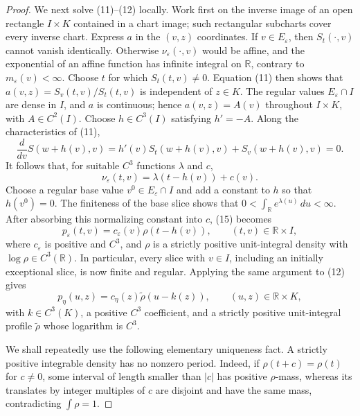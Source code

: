 \documentclass{article}
\begin{document}
\begin{proof}
We next solve (11)--(12) locally.  Work first on the inverse image of an open rectangle \(I\times K\) contained in a chart image; such rectangular subcharts cover every inverse chart.  Express \(a\) in the \((v,z)\) coordinates.  If \(v\in E_\varepsilon\), then \(S_t(\mathord\cdot,v)\) cannot vanish identically.  Otherwise \(\nu_\varepsilon(\mathord\cdot,v)\) would be affine, and the exponential of an affine function has infinite integral on \(\mathbb R\), contrary to \(m_\varepsilon(v)<\infty\).  Choose \(t\) for which \(S_t(t,v)\ne0\).  Equation (11) then shows that \(a(v,z)=S_v(t,v)/S_t(t,v)\) is independent of \(z\in K\).  The regular values \(E_\varepsilon\cap I\) are dense in \(I\), and \(a\) is continuous; hence \(a(v,z)=A(v)\) throughout \(I\times K\), with \(A\in C^2(I)\).  Choose \(h\in C^3(I)\) satisfying \(h'=-A\).  Along the characteristics of (11),
\[
 \frac{d}{dv}S(w+h(v),v)=h'(v)S_t(w+h(v),v)+S_v(w+h(v),v)=0.
\tag{14}
\]
It follows that, for suitable \(C^3\) functions \(\lambda\) and \(c\),
\[
 \nu_\varepsilon(t,v)=\lambda(t-h(v))+c(v).
\tag{15}
\]
Choose a regular base value \(v^0\in E_\varepsilon\cap I\) and add a constant to \(h\) so that \(h(v^0)=0\).  The finiteness of the base slice shows that \(0<\int_{\mathbb R}e^{\lambda(u)}\,du<\infty\).  After absorbing this normalizing constant into \(c\), (15) becomes
\[
 p_\varepsilon(t,v)=c_\varepsilon(v)\rho(t-h(v)),
 \qquad (t,v)\in\mathbb R\times I,
\tag{16}
\]
where \(c_\varepsilon\) is positive and \(C^3\), and \(\rho\) is a strictly positive unit-integral density with \(\log\rho\in C^3(\mathbb R)\).  In particular, every slice with \(v\in I\), including an initially exceptional slice, is now finite and regular.  Applying the same argument to (12) gives
\[
 p_\eta(u,z)=c_\eta(z)\widetilde\rho(u-k(z)),
 \qquad (u,z)\in\mathbb R\times K,
\tag{17}
\]
with \(k\in C^3(K)\), a positive \(C^3\) coefficient, and a strictly positive unit-integral profile \(\widetilde\rho\) whose logarithm is \(C^3\).

We shall repeatedly use the following elementary uniqueness fact.  A strictly positive integrable density has no nonzero period.  Indeed, if \(\rho(t+c)=\rho(t)\) for \(c\ne0\), some interval of length smaller than \(|c|\) has positive \(\rho\)-mass, whereas its translates by integer multiples of \(c\) are disjoint and have the same mass, contradicting \(\int\rho=1\).


\end{proof}
\end{document}
